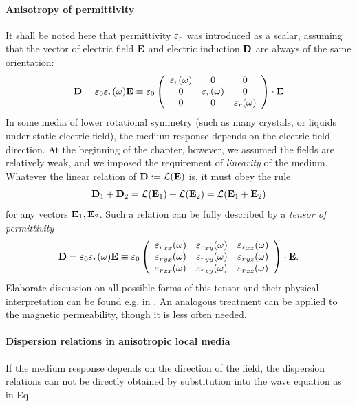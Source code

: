 \paragraph{Anisotropy of permittivity} \label{par_anisotropy} %
It shall be noted here that permittivity $\varepsilon_r$ was introduced as a scalar, assuming that the vector of electric field $\mathbf{E}$ and electric induction $\mathbf{D}$ are always of the same orientation:
\begin{equation} \mathbf{D} = \varepsilon_0 \varepsilon_r(\omega) \mathbf{E} \equiv \varepsilon_0  
	\left(\begin{array}{ccc} 
			\varepsilon_r(\omega) & 0 & 0  \\
			0 & \varepsilon_r(\omega) & 0  \\
			0 & 0 &\varepsilon_r(\omega)  
	\end{array} \right) \cdot \mathbf{E}
	\label{eq_ed_orientation}
\end{equation}
In some media of lower rotational symmetry (such as many crystals, or liquids under static electric field), the medium response depends on the electric field direction. At the beginning of the chapter, however, we assumed the fields are relatively weak, and we imposed the requirement of \textit{linearity} of the medium. Whatever the linear relation of $\mathbf{D} := \mathcal{L}(\mathbf{E})$
is, it must obey the rule
$$\mathbf{D}_1 + \mathbf{D}_2 = \mathcal{L}(\mathbf{E}_1) + \mathcal{L}(\mathbf{E}_2) = \mathcal{L}(\mathbf{E}_1 + \mathbf{E}_2)$$
for any vectors $\mathbf{E}_1, \mathbf{E}_2$. Such a relation can be fully described by a \textit{tensor of permittivity} %
\begin{equation} \mathbf{D} = \varepsilon_0 \varepsilon_r(\omega) \mathbf{E} \equiv \varepsilon_0  
	\left(\begin{array}{ccc} 
	{\varepsilon_r}_{xx}(\omega) & {\varepsilon_r}_{xy}(\omega) & {\varepsilon_r}_{xz}(\omega)  \\
	{\varepsilon_r}_{yx}(\omega) & {\varepsilon_r}_{yy}(\omega) & {\varepsilon_r}_{yz}(\omega)  \\
	{\varepsilon_r}_{zx}(\omega) & {\varepsilon_r}_{zy}(\omega) & {\varepsilon_r}_{zz}(\omega)  
	\end{array} \right) \cdot \mathbf{E}.
	\label{eq_epstensor}
\end{equation}
Elaborate discussion on all possible forms of this tensor and their physical interpretation can be found e.g. in \cite[pp. 678--686]{born1999book}. An analogous treatment can be applied to the magnetic permeability, though it is less often needed.

\paragraph{Dispersion relations in anisotropic local media}  %
If the medium response depends on the direction of the field, the dispersion relations can not be directly obtained by substitution into the wave equation as in Eq. %

